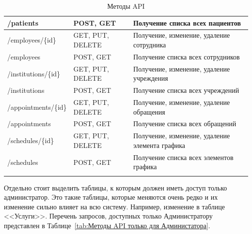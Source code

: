 \documentclass[a4paper,article]{article}
\begin{document}
\begin{sloppypar}
\begin{xltabular}{\textwidth} { |
        >{\hsize} X |
        >{\hsize} X |
        >{\hsize} X | }
        \hline
        /patients
        & POST, GET
        & Получение списка всех пациентов \\

        \hline
        /employees/\{id\}
        & GET, PUT, DELETE
        & Получение, изменение, удаление сотрудника \\

        \hline
        /employees
        & POST, GET
        & Получение списка всех сотрудников \\

        \hline
        /institutions/\{id\}
        & GET, PUT, DELETE
        & Получение, изменение, удаление учреждения  \\

        \hline
        /institutions
        & POST, GET
        & Получение списка всех учреждений \\

        \hline
        /appointments/\{id\}
        & GET, PUT, DELETE
        & Получение, изменение, удаление обращения \\

        \hline
        /appointments
        & POST, GET
        & Получение списка всех обращений \\

        \hline
        /schedules/\{id\}
        & GET, PUT, DELETE
        & Получение, изменение, удаление элемента графика \\

        \hline
        /schedules
        & POST, GET
        & Получение списка всех элементов графика \\

        \hline

        \caption{\centering Методы API}

        \label{tab:Методы API}
    \end{xltabular}

    Отдельно стоит выделить таблицы, к которым должен иметь доступ только администратор. Это такие таблицы, которые меняются очень редко и их изменение сильно влияет на всю систему. Например, изменение в таблице <<Услуги>>. Перечень запросов, доступных только Администратору представлен в Таблице~\ref{tab:Методы API только для Администатора}.

    \begin{xltabular}{\textwidth} { |
        >{\hsize} X |
        >{\hsize} X |
        >{\hsize} X | }


\end{xltabular}
\end{sloppypar}
\end{document}
